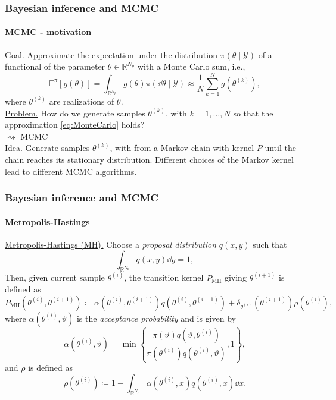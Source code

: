 \documentclass{beamer}
\newcommand{\R}{\mathbb{R}}
\newcommand{\E}{\mathbb{E}}
\newcommand{\defeq}{\coloneqq}
\begin{document}
\begin{frame}
	\frametitle{Bayesian inference and MCMC}
	\framesubtitle{MCMC - motivation}
	
	\underline{Goal.} Approximate the expectation under the distribution $\pi(\theta \mid \mathcal{Y})$ of a functional of the parameter $\theta \in \R^{N_p}$ with a Monte Carlo sum, i.e.,
	\begin{equation*}\label{eq:MonteCarlo}
			 \E^\pi\left[g(\theta)\right] = \int_{\R^{N_p}} g(\theta)\pi(\dd\theta\mid\mathcal{Y})  \approx \frac{1}{N}\sum_{k = 1}^{N} g(\theta^{(k)}),
	\end{equation*}
	where $\theta^{(k)}$ are realizations of $\theta$. \\[0.5cm]
	\underline{Problem.} How do we generate samples $\theta^{(k)}$, with $k = 1, \ldots, N$ so that the approximation \eqref{eq:MonteCarlo} holds? \\
	$\rightsquigarrow$ MCMC \cite[e.g.]{Gil05} \\[0.5cm]
	\underline{Idea.} Generate samples $\theta^{(k)}$, with from a Markov chain with kernel $P$ until the chain reaches its stationary distribution. Different choices of the Markov kernel lead to different MCMC algorithms.	
\end{frame}

\begin{frame}
	\frametitle{Bayesian inference and MCMC}
	\framesubtitle{Metropolis-Hastings}		
	
	\underline{Metropolis-Hastings (MH).} Choose a \textit{proposal distribution} $q(x,y)$ such that
	\begin{equation*}
		\int_{\R^{N_p}}q(x, y)\dd y = 1,
	\end{equation*}
	Then, given current sample $\theta^{(i)}$, the transition kernel $P_{\mathrm{MH}}$ giving $\theta^{(i+1)}$ is defined as
	\begin{equation*}
		P_{\mathrm{MH}}(\theta^{(i)}, \theta^{(i+1)}) \defeq \alpha(\theta^{(i)}, \theta^{(i+1)})q(\theta^{(i)},\theta^{(i+1)}) + \delta_{\theta^{(i)}}(\theta^{(i+1)})\rho(\theta^{(i)}),
	\end{equation*}
	where $\alpha(\theta^{(i)}, \vartheta)$ is the \textit{acceptance probability} and is given by
	\begin{equation*}\label{eq:MHalpha}
		\alpha(\theta^{(i)}, \vartheta) = \min\left\{\frac{\pi(\vartheta)q(\vartheta, \theta^{(i)})}{\pi(\theta^{(i)})q(\theta^{(i)}, \vartheta)}, 1\right\},
	\end{equation*}
	and $\rho$ is defined as
	\begin{equation*}
	 	\rho(\theta^{(i)}) \defeq 1 - \int_{\R^{N_p}}\alpha(\theta^{(i)}, x)q(\theta^{(i)}, x)\dd x.
	\end{equation*}
\end{frame}
\end{document}
